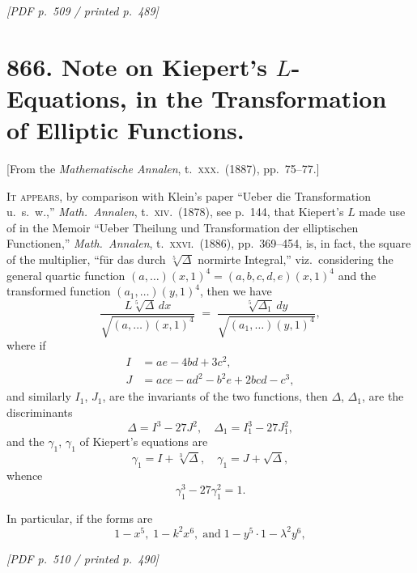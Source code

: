 \documentclass[11pt]{article}
\begin{document}
\vfill
\noindent\textit{[PDF p.~509 / printed p.~489]}
\newpage

\section*{866. Note on Kiepert's $L$-Equations, in the Transformation of Elliptic Functions.}

\begin{flushright}\small
[From the \textit{Mathematische Annalen}, t.~\textsc{xxx}.\ (1887), pp.~75--77.]
\end{flushright}

\medskip

\noindent\textsc{It appears}, by comparison with Klein's paper ``Ueber die Transformation u.~s.~w.,'' \textit{Math.\ Annalen}, t.~\textsc{xiv}.\ (1878), see p.~144, that Kiepert's $L$ made use of in the Memoir ``Ueber Theilung und Transformation der elliptischen Functionen,'' \textit{Math.\ Annalen}, t.~\textsc{xxvi}.\ (1886), pp.~369--454, is, in fact, the square of the multiplier, ``f\"ur das durch $\sqrt[5]{\Delta}$ normirte Integral,'' viz.\ considering the general quartic function $(a, \ldots)(x, 1)^{4} = (a, b, c, d, e)(x, 1)^{4}$ and the transformed function $(a_{1}, \ldots)(y, 1)^{4}$, then we have
\[
\frac{L\sqrt[5]{\Delta}\,dx}{\sqrt{(a, \ldots)(x, 1)^{4}}}\;=\;\frac{\sqrt[5]{\Delta_{1}}\,dy}{\sqrt{(a_{1}, \ldots)(y, 1)^{4}}},
\]
where if
\begin{align*}
I &= ae - 4bd + 3c^{2}, \\
J &= ace - ad^{2} - b^{2}e + 2bcd - c^{3},
\end{align*}
and similarly $I_{1}$, $J_{1}$, are the invariants of the two functions, then $\Delta$, $\Delta_{1}$, are the discriminants
\[
\Delta = I^{3} - 27J^{2},\quad \Delta_{1} = I_{1}^{3} - 27J_{1}^{2},
\]
and the $\gamma_{1}$, $\gamma_{1}$ of Kiepert's equations are
\[
\gamma_{1} = I + \sqrt[3]{\Delta},\quad \gamma_{1} = J + \sqrt{\Delta},
\]
whence
\[
\gamma_{1}^{3} - 27\gamma_{1}^{2} = 1.
\]

In particular, if the forms are
\[
1 - x^{5},\;1 - k^{2}x^{6},\;\text{and}\;1 - y^{5}\cdot 1 - \lambda^{2}y^{6},
\]

\vfill
\noindent\textit{[PDF p.~510 / printed p.~490]}
\newpage
\end{document}
